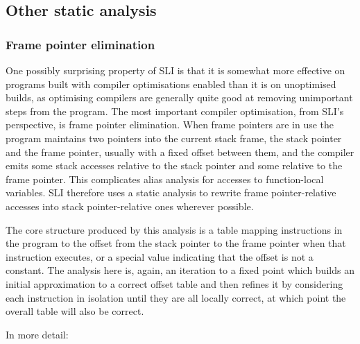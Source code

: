 \subsection{Other static analysis}

\subsubsection{Frame pointer elimination}

One possibly surprising property of SLI is that it is somewhat more
effective on programs built with compiler optimisations enabled than
it is on unoptimised builds, as optimising compilers are generally
quite good at removing unimportant steps from the program.  The most
important compiler optimisation, from SLI's perspective, is frame
pointer elimination.  When frame pointers are in use the program
maintains two pointers into the current stack frame, the stack pointer
and the frame pointer, usually with a fixed offset between them, and
the compiler emits some stack accesses relative to the stack pointer
and some relative to the frame pointer.  This complicates alias
analysis for accesses to function-local variables.  SLI therefore uses
a static analysis to rewrite frame pointer-relative accesses into
stack pointer-relative ones wherever possible.

The core structure produced by this analysis is a table mapping
instructions in the program to the offset from the stack pointer to
the frame pointer when that instruction executes, or a special value
indicating that the offset is not a constant.  The analysis here is,
again, an iteration to a fixed point which builds an initial
approximation to a correct offset table and then refines it by
considering each instruction in isolation until they are all locally
correct, at which point the overall table will also be correct.

In more detail:

